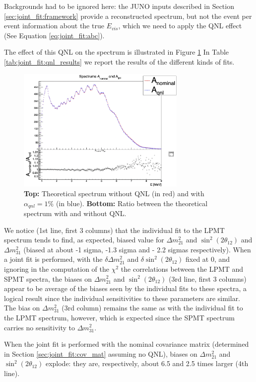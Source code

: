 \documentclass[../main.tex]{subfiles}
\begin{document}
Backgrounds had to be ignored here: the JUNO inputs described in Section \ref{sec:joint_fit:framework} provide a reconstructed spectrum, but not the event per event information about the true $E_{vis}$, which we need to apply the QNL effect (See Equation \ref{eq:joint_fit:abc}).

The effect of this QNL on the spectrum is illustrated in Figure \ref{fig:joint_fit:anom_aqnl} In Table \ref{tab:joint_fit:qnl_results} we report the results of the different kinds of fits.

\begin{figure}[ht]
  \centering
  \includegraphics[height=6cm]{images/joint_fit/AnominalAQNL.png}
  \caption{\textbf{Top:} Theoretical spectrum without QNL (in red) and with $\alpha_{qnl} = 1\%$ (in blue). \textbf{Bottom:} Ratio between the theoretical spectrum with and without QNL.}
  \label{fig:joint_fit:anom_aqnl}
\end{figure}

We notice (1st line, first 3 columns) that the individual fit to the LPMT spectrum tends to find, as expected, biased value for $\Delta m^2_{21}$ and $\sin^2(2 \theta_{12})$ and $\Delta m^2_{31}$ (biased at about -1 sigma, -1.3 sigma and - 2.2 sigmas respectively). When a joint fit is performed, with the $\delta \Delta m^2_{21}$ and $\delta \sin^2(2 \theta_{12})$ fixed at 0, and ignoring in the computation of the $\chi^2$ the correlations between the LPMT and SPMT spectra, the biases on $\Delta m^2_{21}$ and $\sin^2(2 \theta_{12})$ (3rd line, first 3 columns) appear to be average of the biases seen by the individual fits to these spectra, a logical result since the individual sensitivities to these parameters are similar. The bias on $\Delta m^2_{31}$ (3rd column) remains the same as with the individual fit to the LPMT spectrum, however, which is expected since the SPMT spectrum carries no sensitivity to $\Delta m^2_{31}$.

When the joint fit is performed with the nominal covariance matrix (determined in Section \ref{sec:joint_fit:cov_mat} assuming no QNL), biases on
$\Delta m^2_{21}$ and $\sin^2(2 \theta_{12})$ explode: they are, respectively, about 6.5 and 2.5 times larger (4th line).
\end{document}
